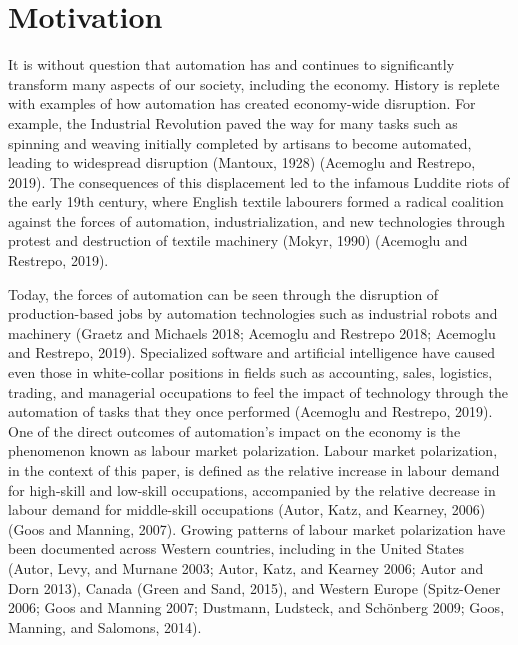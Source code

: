 \documentclass[undefended]{bumrp}
\begin{document}
%
\tableofcontents%
\clearpage

%
\listoftables%
\clearpage

%
\listoffigures%
\clearpage



\mainmatter%

\chapter{Motivation}

It is without question that automation has and continues to significantly transform many aspects of our society, including the economy. History is replete with examples of how automation has created economy-wide disruption. For example, the Industrial Revolution paved the way for many tasks such as spinning and weaving initially completed by artisans to become automated, leading to widespread disruption (Mantoux, 1928) (Acemoglu and Restrepo, 2019). The consequences of this displacement led to the infamous Luddite riots of the early 19th century, where English textile labourers formed a radical coalition against the forces of automation, industrialization, and new technologies through protest and destruction of textile machinery (Mokyr, 1990) (Acemoglu and Restrepo, 2019). 

Today, the forces of automation can be seen through the disruption of production-based jobs by automation technologies such as industrial robots and machinery (Graetz and Michaels 2018; Acemoglu and Restrepo 2018; Acemoglu and Restrepo, 2019). Specialized software and artificial intelligence have caused even those in white-collar positions in fields such as accounting, sales, logistics, trading, and managerial occupations to feel the impact of technology through the automation of tasks that they once performed (Acemoglu and Restrepo, 2019). 
One of the direct outcomes of automation’s impact on the economy is the phenomenon known as labour market polarization. Labour market polarization, in the context of this paper, is defined as the relative increase in labour demand for high-skill and low-skill occupations, accompanied by the relative decrease in labour demand for middle-skill occupations (Autor, Katz, and Kearney, 2006) (Goos and Manning, 2007). Growing patterns of labour market polarization have been documented across Western countries, including in the United States (Autor, Levy, and Murnane 2003; Autor, Katz, and Kearney 2006; Autor and Dorn 2013), Canada (Green and Sand, 2015), and Western Europe (Spitz-Oener 2006; Goos and Manning 2007; Dustmann, Ludsteck, and Schönberg 2009; Goos, Manning, and Salomons, 2014). 
\end{document}
